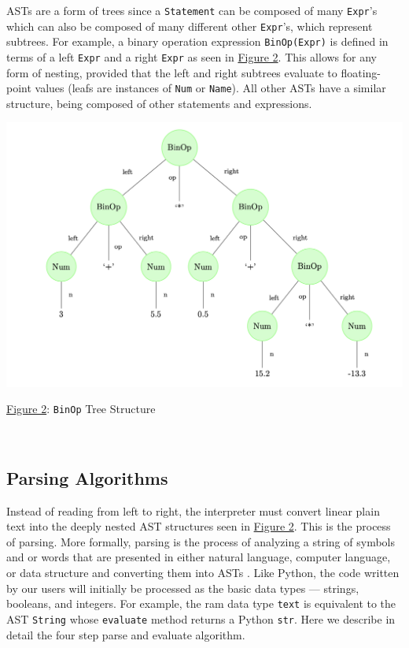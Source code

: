 \documentclass[11pt]{article}
\begin{document}
ASTs are a form of trees since a \texttt{Statement} can be composed of many \texttt{Expr}'s which can also be composed of many different other \texttt{Expr}'s, which represent subtrees. For example, a binary operation expression \texttt{BinOp(Expr)} is defined in terms of a left \texttt{Expr} and a right \texttt{Expr} as seen in \hyperlink{fig2}{Figure 2}. This allows for any form of nesting, provided that the left and right subtrees evaluate to  floating-point values (leafs are instances of \texttt{Num} or \texttt{Name}). All other ASTs have a similar structure, being composed of other statements and expressions.

\begin{center}
    \hypertarget{fig2}{}

    \includegraphics[scale=0.4]{binop2.png}
    
    \small{\hyperlink{fig2}{Figure 2}: \texttt{BinOp} Tree Structure \cite{david}}
    
    $ $
\end{center}

\subsection{Parsing Algorithms}

Instead of reading from left to right, the interpreter must convert linear plain text into the deeply nested AST structures seen in \hyperlink{fig2}{Figure 2}. This is the process of parsing. More formally, parsing is the process of analyzing a string of symbols and or words that are presented in either natural language, computer language, or data structure and converting them into ASTs \cite{def}. Like Python, the code written by our users will initially be processed as the basic data types --- strings, booleans, and integers. For example, the ram data type \texttt{text} is equivalent to the AST \texttt{String} whose \texttt{evaluate} method returns a Python \texttt{str}. Here we describe in detail the four step parse and evaluate algorithm.
\end{document}
